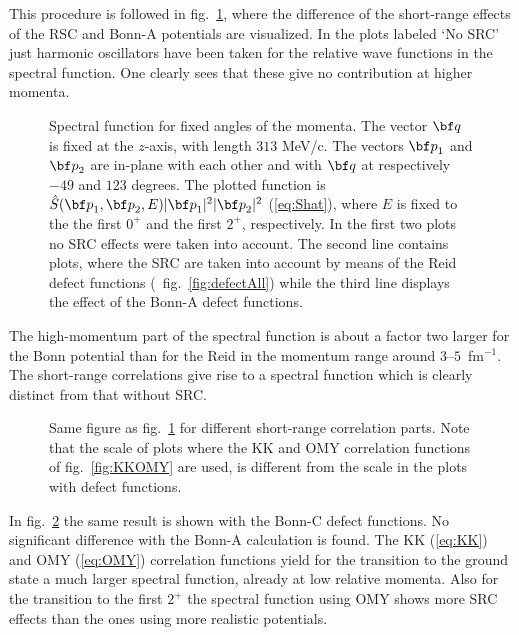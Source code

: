 This procedure is followed in fig.~\ref{fig:sfC1}, where the 
difference of the short-range effects of the RSC and Bonn-A potentials 
are visualized.
In the plots labeled `No SRC' just harmonic oscillators have been taken for 
the relative wave functions in the spectral function. One clearly sees that 
these give no contribution at higher momenta.
\begin{figure}
\centerline{%
}
\centerline{%
}
\centerline{%
}
\caption[]{%
Spectral function for fixed angles of the momenta. 
The vector $\rvec{q}$ is fixed at the $z$-axis, with length $313$ MeV/c.
The vectors $\rvec{p}_1$ and $\rvec{p}_2$ are in-plane with each other
and with $\rvec{q}$ at respectively $-49$ and $123$ degrees.
The plotted function is 
$\hat{S}(\rvec{p}_1, \rvec{p}_2, E)|\rvec{p}_1|^2|\rvec{p}_2|^2$ 
(\ref{eq:Shat}),
where $E$ is fixed to the the first $0^+$ and the first $2^+$, respectively.
In the first two plots no SRC effects were taken into account. The second
line contains plots, where the SRC are taken into account by means of the
Reid defect functions (\cf\ fig.~\ref{fig:defectAll}) while the third line 
displays the effect of the Bonn-A defect functions.
\label{fig:sfC1}}
\end{figure}
The high-momentum part of the spectral function is about a factor two larger 
for the Bonn potential than for the Reid in the momentum range around 
$3$--$5$~fm$^{-1}$. The short-range correlations give rise to a spectral 
function which is clearly distinct from that without SRC.
\begin{figure}
\centerline{%
}
\centerline{%
}
\centerline{%
}
\caption[]{%
Same figure as fig.~\ref{fig:sfC1} for different short-range correlation
parts. Note that the scale of plots where the KK and OMY correlation functions
of fig.~\ref{fig:KKOMY} are used, 
is different from the scale in the plots with defect functions.
\label{fig:sf2C1}}
\end{figure}
In fig.~\ref{fig:sf2C1} the same result is shown with the
Bonn-C defect functions. No significant difference with the
Bonn-A calculation is found. 
The KK (\ref{eq:KK}) and OMY (\ref{eq:OMY}) correlation
functions yield for the transition to 
the ground state a much larger spectral function, 
already at low relative momenta. Also for the transition to the first $2^+$ 
the spectral function using OMY shows more SRC effects than the ones using 
more realistic potentials.
